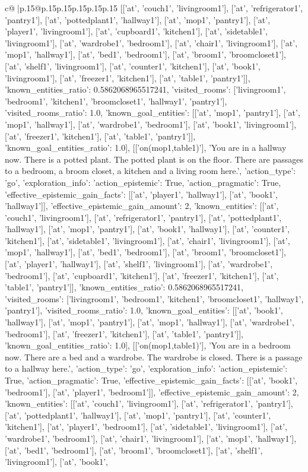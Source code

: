 \documentclass{article}
\begin{document}
{\begin{supertabular}{c@{$\;$}|p{.15\linewidth}@{}p{.15\linewidth}p{.15\linewidth}p{.15\linewidth}p{.15\linewidth}p{.15\linewidth}}
{{{[['at', 'couch1', 'livingroom1'], ['at', 'refrigerator1', 'pantry1'], ['at', 'pottedplant1', 'hallway1'], ['at', 'mop1', 'pantry1'], ['at', 'player1', 'livingroom1'], ['at', 'cupboard1', 'kitchen1'], ['at', 'sidetable1', 'livingroom1'], ['at', 'wardrobe1', 'bedroom1'], ['at', 'chair1', 'livingroom1'], ['at', 'mop1', 'hallway1'], ['at', 'bed1', 'bedroom1'], ['at', 'broom1', 'broomcloset1'], ['at', 'shelf1', 'livingroom1'], ['at', 'counter1', 'kitchen1'], ['at', 'book1', 'livingroom1'], ['at', 'freezer1', 'kitchen1'], ['at', 'table1', 'pantry1']], 'known_entities_ratio': 0.5862068965517241, 'visited_rooms': ['livingroom1', 'bedroom1', 'kitchen1', 'broomcloset1', 'hallway1', 'pantry1'], 'visited_rooms_ratio': 1.0, 'known_goal_entities': [['at', 'mop1', 'pantry1'], ['at', 'mop1', 'hallway1'], ['at', 'wardrobe1', 'bedroom1'], ['at', 'book1', 'livingroom1'], ['at', 'freezer1', 'kitchen1'], ['at', 'table1', 'pantry1']], 'known_goal_entities_ratio': 1.0}}], [['on(mop1,table1)'], 'You are in a hallway now. There is a potted plant. The potted plant is on the floor. There are passages to a bedroom, a broom closet, a kitchen and a living room here.', {'action_type': 'go', 'exploration_info': {'action_epistemic': True, 'action_pragmatic': True, 'effective_epistemic_gain_facts': [['at', 'player1', 'hallway1'], ['at', 'book1', 'hallway1']], 'effective_epistemic_gain_amount': 2, 'known_entities': [['at', 'couch1', 'livingroom1'], ['at', 'refrigerator1', 'pantry1'], ['at', 'pottedplant1', 'hallway1'], ['at', 'mop1', 'pantry1'], ['at', 'book1', 'hallway1'], ['at', 'counter1', 'kitchen1'], ['at', 'sidetable1', 'livingroom1'], ['at', 'chair1', 'livingroom1'], ['at', 'mop1', 'hallway1'], ['at', 'bed1', 'bedroom1'], ['at', 'broom1', 'broomcloset1'], ['at', 'player1', 'hallway1'], ['at', 'shelf1', 'livingroom1'], ['at', 'wardrobe1', 'bedroom1'], ['at', 'cupboard1', 'kitchen1'], ['at', 'freezer1', 'kitchen1'], ['at', 'table1', 'pantry1']], 'known_entities_ratio': 0.5862068965517241, 'visited_rooms': ['livingroom1', 'bedroom1', 'kitchen1', 'broomcloset1', 'hallway1', 'pantry1'], 'visited_rooms_ratio': 1.0, 'known_goal_entities': [['at', 'book1', 'hallway1'], ['at', 'mop1', 'pantry1'], ['at', 'mop1', 'hallway1'], ['at', 'wardrobe1', 'bedroom1'], ['at', 'freezer1', 'kitchen1'], ['at', 'table1', 'pantry1']], 'known_goal_entities_ratio': 1.0}}], [['on(mop1,table1)'], 'You are in a bedroom now. There are a bed and a wardrobe. The wardrobe is closed. There is a passage to a hallway here.', {'action_type': 'go', 'exploration_info': {'action_epistemic': True, 'action_pragmatic': True, 'effective_epistemic_gain_facts': [['at', 'book1', 'bedroom1'], ['at', 'player1', 'bedroom1']], 'effective_epistemic_gain_amount': 2, 'known_entities': [['at', 'couch1', 'livingroom1'], ['at', 'refrigerator1', 'pantry1'], ['at', 'pottedplant1', 'hallway1'], ['at', 'mop1', 'pantry1'], ['at', 'counter1', 'kitchen1'], ['at', 'player1', 'bedroom1'], ['at', 'sidetable1', 'livingroom1'], ['at', 'wardrobe1', 'bedroom1'], ['at', 'chair1', 'livingroom1'], ['at', 'mop1', 'hallway1'], ['at', 'bed1', 'bedroom1'], ['at', 'broom1', 'broomcloset1'], ['at', 'shelf1', 'livingroom1'], ['at', 'book1', }}}
\end{supertabular}}
\end{document}
